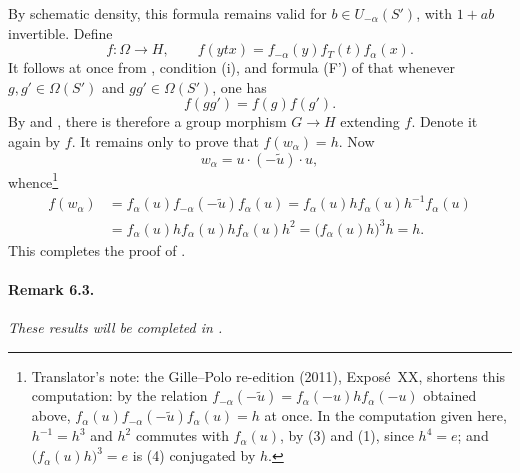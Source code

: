 By schematic density, this formula remains valid for
\(b\in U_{-\alpha}(S')\), with \(1+ab\) invertible.  Define
\[
 f\colon\Omega\longrightarrow H,
 \qquad
 f(ytx)=f_{-\alpha}(y)f_T(t)f_\alpha(x).
\]
It follows at once from , condition \textup{(i)}, and
formula \textup{(F')} of  that whenever
\(g,g'\in\Omega(S')\) and \(gg'\in\Omega(S')\), one has
\[
 f(gg')=f(g)f(g').
\]
By \textup{} and , there is therefore
a group morphism \(G\to H\) extending \(f\).  Denote it again by
\(f\).  It remains only to prove that \(f(w_\alpha)=h\).  Now
\[
 w_\alpha=u\cdot(-\widetilde u)\cdot u,
\]
whence\footnote{Translator's note: the Gille--Polo re-edition (2011), Exposé~XX, shortens this computation: by the relation
\(f_{-\alpha}(-\widetilde u)=f_\alpha(-u)hf_\alpha(-u)\) obtained above,
\(f_\alpha(u)f_{-\alpha}(-\widetilde u)f_\alpha(u)=h\) at once. In the computation given here,
\(h^{-1}=h^3\) and \(h^2\) commutes with \(f_\alpha(u)\), by \textup{(3)} and \textup{(1)}, since
\(h^4=e\); and \(\bigl(f_\alpha(u)h\bigr)^3=e\) is \textup{(4)} conjugated by \(h\).}
\[
\begin{aligned}
 f(w_\alpha)
 &=f_\alpha(u)f_{-\alpha}(-\widetilde u)f_\alpha(u)
  =f_\alpha(u)hf_\alpha(u)h^{-1}f_\alpha(u)\\
 &=f_\alpha(u)hf_\alpha(u)hf_\alpha(u)h^2
  =\bigl(f_\alpha(u)h\bigr)^3h=h.
\end{aligned}
\]
This completes the proof of .

\paragraph{\textbf{Remark 6.3.}}
\emph{These results will be completed in .}

